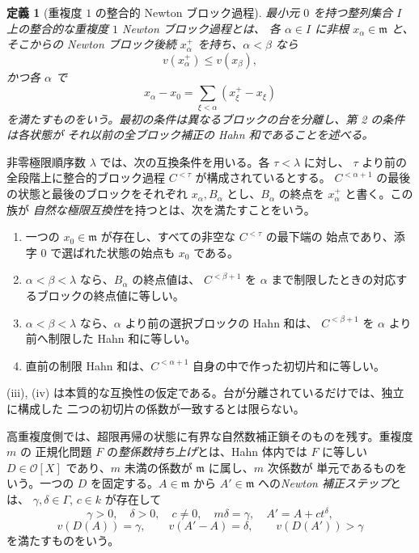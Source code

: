 \documentclass[11pt,uplatex,dvipdfmx]{jsarticle}
\newcommand{\Val}{v}
\newcommand{\Ocal}{\mathcal O}
\theoremstyle{proofnote}
\newtheorem{definition}[theorem]{定義}
\begin{document}
\begin{definition}[重複度 \(1\) の整合的 Newton ブロック過程]
\label{def:coherent-one-block}
  最小元 \(0\) を持つ整列集合 \(I\) 上の\emph{整合的な重複度 \(1\) Newton ブロック過程}とは、
  各 \(\alpha\in I\) に非根 \(x_\alpha\in\mathfrak m\) と、そこからの Newton ブロック後続
  \(x_\alpha^+\) を持ち、\(\alpha<\beta\) なら
  \[
    v(x_\alpha^+)\le v(x_\beta),
  \]
  かつ各 \(\alpha\) で
  \[
    x_\alpha-x_0=\sum_{\xi<\alpha}(x_\xi^+-x_\xi)
    \tag{BC}\label{eq:block-coherence}
  \]
  を満たすものをいう。最初の条件は異なるブロックの台を分離し、第 2 の条件は各状態が
  それ以前の全ブロック補正の Hahn 和であることを述べる。
\end{definition}

非零極限順序数 \(\lambda\) では、次の互換条件を用いる。各 \(\tau<\lambda\) に対し、
\(\tau\) より前の全段階上に整合的ブロック過程 \(C^{<\tau}\) が構成されているとする。
\(C^{<\alpha+1}\) の最後の状態と最後のブロックをそれぞれ
\(x_\alpha,B_\alpha\) とし、\(B_\alpha\) の終点を \(x_\alpha^+\) と書く。この族が
\emph{自然な極限互換性}を持つとは、次を満たすことをいう。
\begin{enumerate}[label=(\roman*)]
  \item 一つの \(x_0\in\mathfrak m\) が存在し、すべての非空な \(C^{<\tau}\) の最下端の
    始点であり、添字 \(0\) で選ばれた状態の始点も \(x_0\) である。
  \item \(\alpha<\beta<\lambda\) なら、\(B_\alpha\) の終点値は、
    \(C^{<\beta+1}\) を \(\alpha\) まで制限したときの対応するブロックの終点値に等しい。
  \item \(\alpha<\beta<\lambda\) なら、\(\alpha\) より前の選択ブロックの Hahn 和は、
    \(C^{<\beta+1}\) を \(\alpha\) より前へ制限した Hahn 和に等しい。
  \item 直前の制限 Hahn 和は、\(C^{<\alpha+1}\) 自身の中で作った初切片和に等しい。
\end{enumerate}
(iii), (iv) は本質的な互換性の仮定である。台が分離されているだけでは、独立に構成した
二つの初切片の係数が一致するとは限らない。

高重複度側では、超限再帰の状態に有界な自然数補正鎖そのものを残す。重複度 \(m\) の
正規化問題 \(F\) の\emph{整係数持ち上げ}とは、Hahn 体内では \(F\) に等しい
\(D\in\Ocal[X]\) であり、\(m\) 未満の係数が \(\mathfrak m\) に属し、\(m\) 次係数が
単元であるものをいう。一つの \(D\) を固定する。\(A\in\mathfrak m\) から
\(A'\in\mathfrak m\) への\emph{Newton 補正ステップ}とは、
\(\gamma,\delta\in\Gamma\), \(c\in k\) が存在して
\[
  \gamma>0,\quad\delta>0,\quad c\ne0,\quad m\delta=\gamma,
  \quad A'=A+ct^\delta,
\]
\[
  \Val(D(A))=\gamma,\qquad
  \Val(A'-A)=\delta,\qquad
  \Val(D(A'))>\gamma
  \tag{NS}\label{eq:newton-step-data}
\]
を満たすものをいう。
\end{document}
